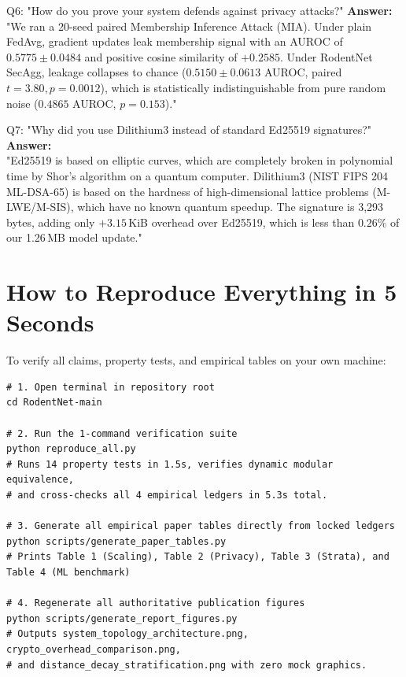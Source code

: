 \documentclass[11pt,a4paper]{report}
\begin{document}
\begin{infobox}{Q6: "How do you prove your system defends against privacy attacks?"}
\textbf{Answer:} \\
"We ran a 20-seed paired Membership Inference Attack (MIA). Under plain FedAvg, gradient updates leak membership signal with an AUROC of $0.5775 \pm 0.0484$ and positive cosine similarity of $+0.2585$. Under RodentNet SecAgg, leakage collapses to chance ($0.5150 \pm 0.0613$ AUROC, paired $t=3.80, p=0.0012$), which is statistically indistinguishable from pure random noise ($0.4865$ AUROC, $p=0.153$)."
\end{infobox}

\begin{infobox}{Q7: "Why did you use Dilithium3 instead of standard Ed25519 signatures?"}
\textbf{Answer:} \\
"Ed25519 is based on elliptic curves, which are completely broken in polynomial time by Shor's algorithm on a quantum computer. Dilithium3 (NIST FIPS 204 ML-DSA-65) is based on the hardness of high-dimensional lattice problems (M-LWE/M-SIS), which have no known quantum speedup. The signature is 3,293 bytes, adding only $+3.15$\,KiB overhead over Ed25519, which is less than $0.26\%$ of our 1.26\,MB model update."
\end{infobox}

\chapter{How to Reproduce Everything in 5 Seconds}
\label{chap:reproduce}

To verify all claims, property tests, and empirical tables on your own machine:
\begin{lstlisting}[style=code]
# 1. Open terminal in repository root
cd RodentNet-main

# 2. Run the 1-command verification suite
python reproduce_all.py
# Runs 14 property tests in 1.5s, verifies dynamic modular equivalence,
# and cross-checks all 4 empirical ledgers in 5.3s total.

# 3. Generate all empirical paper tables directly from locked ledgers
python scripts/generate_paper_tables.py
# Prints Table 1 (Scaling), Table 2 (Privacy), Table 3 (Strata), and Table 4 (ML benchmark)

# 4. Regenerate all authoritative publication figures
python scripts/generate_report_figures.py
# Outputs system_topology_architecture.png, crypto_overhead_comparison.png,
# and distance_decay_stratification.png with zero mock graphics.
\end{lstlisting}
\end{document}
